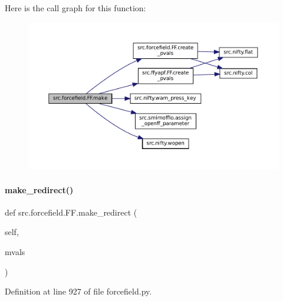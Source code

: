 Here is the call graph for this function\+:
\nopagebreak
\begin{figure}[H]
\begin{center}
\leavevmode
\includegraphics[width=350pt]{classsrc_1_1forcefield_1_1FF_a3bd84ef07970f78b17145ca790e819b7_cgraph}
\end{center}
\end{figure}
\mbox{\label{classsrc_1_1forcefield_1_1FF_abba6f0f0234c8d256bf991fefdd4f0a5}} 
\paragraph{\texorpdfstring{make\+\_\+redirect()}{make\_redirect()}}
{\footnotesize\ttfamily def src.\+forcefield.\+F\+F.\+make\+\_\+redirect (\begin{DoxyParamCaption}\item[{}]{self,  }\item[{}]{mvals }\end{DoxyParamCaption})}



Definition at line 927 of file forcefield.\+py.

